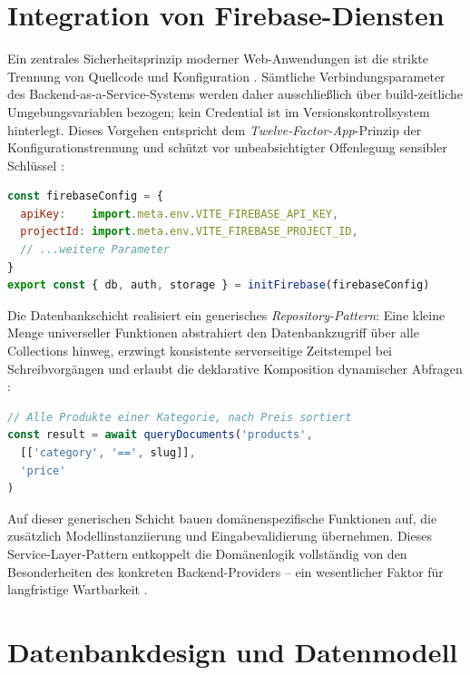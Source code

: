 \section{Integration von Firebase-Diensten}
\label{sec:firebase-integration}

Ein zentrales Sicherheitsprinzip moderner Web-Anwendungen ist die strikte Trennung von Quellcode und Konfiguration \cite{fredj2020}. Sämtliche Verbindungsparameter des Backend-as-a-Service-Systems werden daher ausschließlich über build-zeit\-liche Umgebungsvariablen bezogen; kein Credential ist im Versionskontrollsystem hinterlegt. Dieses Vorgehen entspricht dem \textit{Twelve-Factor-App}-Prinzip der Konfigurationstrennung und schützt vor unbeabsichtigter Offenlegung sensibler Schlüssel \cite{fredj2020}:

\begin{lstlisting}[language=JavaScript, caption=Firebase-Konfiguration über Umgebungsvariablen (config.js)]
const firebaseConfig = {
  apiKey:    import.meta.env.VITE_FIREBASE_API_KEY,
  projectId: import.meta.env.VITE_FIREBASE_PROJECT_ID,
  // ...weitere Parameter
}
export const { db, auth, storage } = initFirebase(firebaseConfig)
\end{lstlisting}

Die Datenbankschicht realisiert ein generisches \textit{Repository-Pattern}: Eine kleine Menge universeller Funktionen abstrahiert den Datenbankzugriff über alle Collections hinweg, erzwingt konsistente serverseitige Zeitstempel bei Schreibvorgängen und erlaubt die deklarative Komposition dynamischer Abfragen \cite{firestore2025}:

\begin{lstlisting}[language=JavaScript, caption=Beispielaufruf der generischen Abfragefunktion]
// Alle Produkte einer Kategorie, nach Preis sortiert
const result = await queryDocuments('products',
  [['category', '==', slug]],
  'price'
)
\end{lstlisting}

Auf dieser generischen Schicht bauen domänenspezifische Funktionen auf, die zusätzlich Modellinstanziierung und Eingabevalidierung übernehmen. Dieses Service-Layer-Pattern entkoppelt die Domänenlogik vollständig von den Besonderheiten des konkreten Backend-Providers -- ein wesentlicher Faktor für langfristige Wartbarkeit \cite{uunonen2023}.

\section{Datenbankdesign und Datenmodell}
\label{sec:datenbankdesign}

